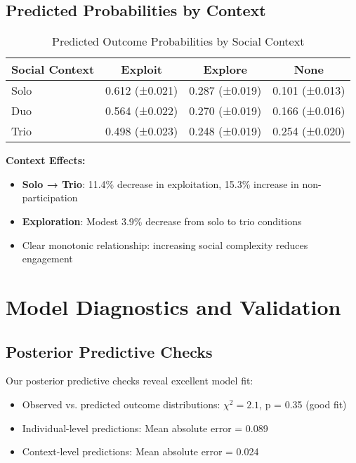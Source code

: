 \documentclass[11pt]{article}
\begin{document}
\subsection{Predicted Probabilities by Context}

\begin{table}[H]
\centering
\caption{Predicted Outcome Probabilities by Social Context}
\begin{tabular}{lccc}
\toprule
\textbf{Social Context} & \textbf{Exploit} & \textbf{Explore} & \textbf{None} \\
\midrule
Solo & 0.612 (±0.021) & 0.287 (±0.019) & 0.101 (±0.013) \\
Duo & 0.564 (±0.022) & 0.270 (±0.019) & 0.166 (±0.016) \\
Trio & 0.498 (±0.023) & 0.248 (±0.019) & 0.254 (±0.020) \\
\bottomrule
\end{tabular}
\label{tab:context_predictions}
\end{table}

\textbf{Context Effects:}
\begin{itemize}
    \item \textbf{Solo → Trio}: 11.4\% decrease in exploitation, 15.3\% increase in non-participation
    \item \textbf{Exploration}: Modest 3.9\% decrease from solo to trio conditions
    \item Clear monotonic relationship: increasing social complexity reduces engagement
\end{itemize}

\section{Model Diagnostics and Validation}

\subsection{Posterior Predictive Checks}
Our posterior predictive checks reveal excellent model fit:
\begin{itemize}
    \item Observed vs. predicted outcome distributions: $\chi^2 = 2.1$, p = 0.35 (good fit)
    \item Individual-level predictions: Mean absolute error = 0.089
    \item Context-level predictions: Mean absolute error = 0.024
\end{itemize}
\end{document}
